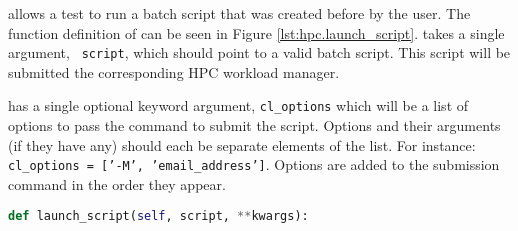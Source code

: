\launchscript allows a test to run a batch script that was created before by
the user. The function definition of \launchscript can be seen in Figure
\ref{lst:hpc.launch_script}. \launchscript takes a single argument, {\tt
script}, which should point to a valid batch script. This script will be
submitted the corresponding HPC workload manager. 

\launchscript has a single optional keyword argument, {\tt cl\_options} which
will be a list of options to pass the command to submit the script. Options and
their arguments (if they have any) should each be separate elements of the
list. For instance: {\tt cl\_options = ['-M', 'email\_address']}. Options are
added to the submission command in the order they appear.

\begin{lstlisting}[language=Python, 
                   caption={HPC.launch\_script},
                   label={lst:hpc.launch_script}]
def launch_script(self, script, **kwargs):
\end{lstlisting}
